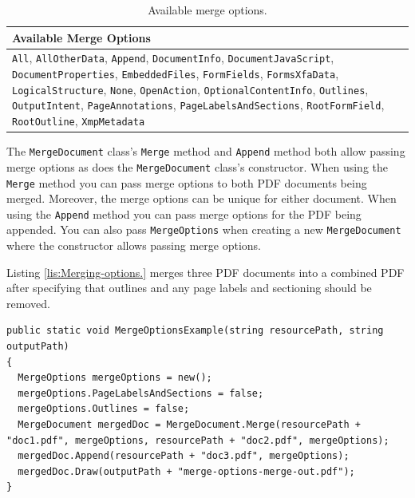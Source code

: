 \documentclass[american,letterpaper]{tufte-book}
\providecommand{\tabularnewline}{\\}
\numberwithin{equation}{section}
\numberwithin{figure}{section}
\begin{document}
{{\begin{table}
\begin{tabular}{>{\raggedright}p{}}
\toprule 
{\small Available Merge Options}\tabularnewline
\midrule 
{\small\texttt{All}}{\small , }{\small\texttt{AllOtherData}}{\small ,
}{\small\texttt{Append}}{\small , }{\small\texttt{DocumentInfo}}{\small ,
}{\small\texttt{DocumentJavaScript}}{\small , }{\small\texttt{DocumentProperties}}{\small ,
}{\small\texttt{EmbeddedFiles}}{\small , }{\small\texttt{FormFields}}{\small ,
}{\small\texttt{FormsXfaData}}{\small , }{\small\texttt{LogicalStructure}}{\small ,
}{\small\texttt{None}}{\small , }{\small\texttt{OpenAction}}{\small ,
}{\small\texttt{OptionalContentInfo}}{\small , }{\small\texttt{Outlines}}{\small ,
}{\small\texttt{OutputIntent}}{\small , }{\small\texttt{PageAnnotations}}{\small ,
}{\small\texttt{PageLabelsAndSections}}{\small , }{\small\texttt{RootFormField}}{\small ,
}{\small\texttt{RootOutline}}{\small , }{\small\texttt{XmpMetadata}}\tabularnewline
\bottomrule
\end{tabular}\caption{Available merge options.}\label{tab:Available-merge-options.}

\end{table}

\medskip{}
The \texttt{MergeDocument} class's \texttt{Merge} method and \texttt{Append}
method both allow passing merge options as does the \texttt{MergeDocument}
class's constructor. When using the \texttt{Merge} method you can
pass merge options to both PDF documents being merged. Moreover, the
merge options can be unique for either document. When using the \texttt{Append}
method you can pass merge options for the PDF being appended. You
can also pass \texttt{MergeOptions} when creating a new \texttt{MergeDocument}
where the constructor allows passing merge options.

Listing \ref{lis:Merging-options.} merges three PDF documents into
a combined PDF after specifying that outlines and any page labels
and sectioning should be removed.

\bgroup{}
\begin{lstlisting}[caption={Merging options.},label={lis:Merging-options.},basicstyle={\small\ttfamily},breaklines=true]
public static void MergeOptionsExample(string resourcePath, string outputPath)
{
  MergeOptions mergeOptions = new();
  mergeOptions.PageLabelsAndSections = false;
  mergeOptions.Outlines = false;
  MergeDocument mergedDoc = MergeDocument.Merge(resourcePath + "doc1.pdf", mergeOptions, resourcePath + "doc2.pdf", mergeOptions);
  mergedDoc.Append(resourcePath + "doc3.pdf", mergeOptions);
  mergedDoc.Draw(outputPath + "merge-options-merge-out.pdf");
}
\end{lstlisting}
\leavevmode\egroup
}}
\end{document}
